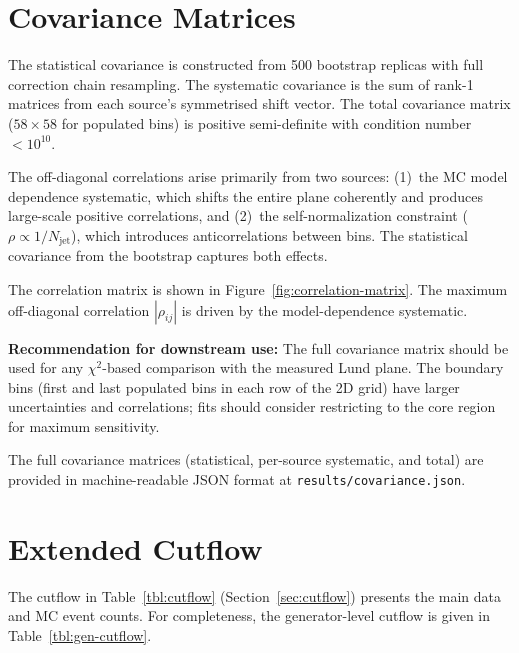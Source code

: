 \documentclass[11pt,a4paper]{article}
\begin{document}
\section{Covariance Matrices}
\label{app:covariance}

The statistical covariance is constructed from 500 bootstrap replicas
with full correction chain resampling.  The systematic covariance is
the sum of rank-1 matrices from each source's symmetrised shift vector.
The total covariance matrix ($58 \times 58$ for populated bins) is
positive semi-definite with condition number $< 10^{10}$.

The off-diagonal correlations arise primarily from two sources:
(1)~the MC model dependence systematic, which shifts the entire plane
coherently and produces large-scale positive correlations, and
(2)~the self-normalization constraint ($\rho \propto 1/N_\text{jet}$),
which introduces anticorrelations between bins.  The statistical
covariance from the bootstrap captures both effects.

The correlation matrix is shown in Figure~\ref{fig:correlation-matrix}.
The maximum off-diagonal correlation $|\rho_{ij}|$ is driven by the
model-dependence systematic.

\textbf{Recommendation for downstream use:} The full covariance matrix
should be used for any $\chi^2$-based comparison with the measured
Lund plane.  The boundary bins (first and last populated bins in each
row of the 2D grid) have larger uncertainties and correlations; fits
should consider restricting to the core region for maximum sensitivity.

The full covariance matrices (statistical, per-source systematic, and
total) are provided in machine-readable JSON format at
\texttt{results/covariance.json}.

\section{Extended Cutflow}
\label{app:cutflow}

The cutflow in Table~\ref{tbl:cutflow} (Section~\ref{sec:cutflow})
presents the main data and MC event counts.  For completeness, the
generator-level cutflow is given in Table~\ref{tbl:gen-cutflow}.
\end{document}
